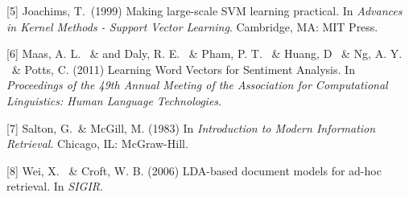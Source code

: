 \documentclass{article}
\begin{document}
[5] Joachims, T.\ (1999) Making large-scale SVM learning practical. In {\it Advances in Kernel Methods - Support Vector Learning}. Cambridge, MA: MIT Press.

[6] Maas, A. L. \ \&  and  Daly, R. E. \ \&  Pham, P. T. \ \&  Huang, D \ \&  Ng, A. Y. \ \& Potts, C. (2011) Learning Word Vectors for Sentiment Analysis. In {\it Proceedings of the 49th Annual Meeting of the Association for Computational Linguistics: Human Language Technologies}.

[7] Salton, G.\ \& McGill, M. (1983) In {\it Introduction to Modern Information Retrieval}. Chicago, IL: McGraw-Hill.

[8] Wei, X. \ \& Croft, W. B. (2006) LDA-based document models for ad-hoc retrieval. In {\it SIGIR}.
\end{document}
